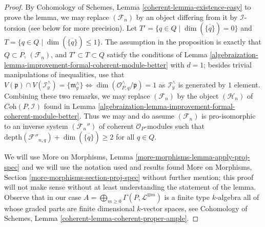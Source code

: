 \begin{proof}

By Cohomology of Schemes, Lemma \ref{coherent-lemma-existence-easy}
to prove the lemma, we may replace $(\mathcal{F}_n)$ by an object
differing from it by $\mathcal{I}$-torsion (see below for more precision).
Let $T' = \{q \in Q \mid \dim(\overline{\{q\}}) = 0\}$
and $T = \{q \in Q \mid \dim(\overline{\{q\}}) \leq 1\}$.
The assumption in the proposition is exactly that
$Q \subset P$, $(\mathcal{F}_n)$, and $T' \subset T \subset Q$
satisfy the conditions of
Lemma \ref{algebraization-lemma-improvement-formal-coherent-module-better}
with $d = 1$; besides trivial manipulations of inequalities, use that
$V(\mathfrak p) \cap V(\mathcal{I}^\wedge_y) = \{\mathfrak m^\wedge_y\}
\Leftrightarrow \dim(\mathcal{O}_{P, q}^\wedge/\mathfrak p) = 1$
as $\mathcal{I}_y^\wedge$ is generated by $1$ element.
Combining these two remarks, we may replace $(\mathcal{F}_n)$ by the
object $(\mathcal{H}_n)$ of $\textit{Coh}(P, \mathcal{I})$ found in
Lemma \ref{algebraization-lemma-improvement-formal-coherent-module-better}.
Thus we may and do assume $(\mathcal{F}_n)$ is pro-isomorphic to
an inverse system $(\mathcal{F}_n'')$ of coherent $\mathcal{O}_P$-modules
such that $\text{depth}(\mathcal{F}''_{n, q}) + \dim(\overline{\{q\}}) \geq 2$
for all $q \in Q$.

\medskip\noindent
We will use More on Morphisms, Lemma \ref{more-morphisms-lemma-apply-proj-spec}
and we will use the notation used and results found
More on Morphisms, Section \ref{more-morphisms-section-proj-spec}
without further mention; this proof will not make sense without
at least understanding the statement of the lemma.
Observe that in our case
$A = \bigoplus_{m \geq 0} \Gamma(P, \mathcal{L}^{\otimes m})$
is a finite type $k$-algebra
all of whose graded parts are finite dimensional $k$-vector spaces, see
Cohomology of Schemes, Lemma \ref{coherent-lemma-coherent-proper-ample}.


\end{proof}

